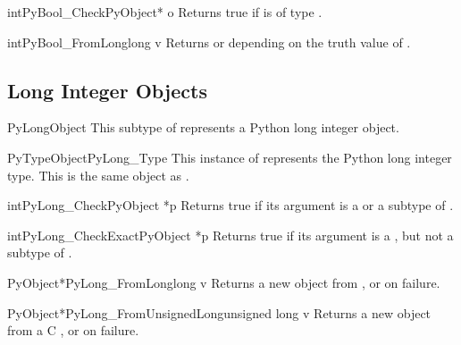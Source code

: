 \begin{cfuncdesc}{int}{PyBool_Check}{PyObject* o}
  Returns true if  is of type .
\end{cfuncdesc}

\begin{cfuncdesc}{int}{PyBool_FromLong}{long v}
Returns  or  depending on the
truth value of .
\end{cfuncdesc}

\subsection{Long Integer Objects \label{longObjects}}

\begin{ctypedesc}{PyLongObject}
  This subtype of  represents a Python long integer
  object.
\end{ctypedesc}

\begin{cvardesc}{PyTypeObject}{PyLong_Type}
  This instance of  represents the Python long
  integer type.  This is the same object as .
\end{cvardesc}

\begin{cfuncdesc}{int}{PyLong_Check}{PyObject *p}
  Returns true if its argument is a  or a subtype
  of .
\end{cfuncdesc}

\begin{cfuncdesc}{int}{PyLong_CheckExact}{PyObject *p}
  Returns true if its argument is a , but not a
  subtype of .
\end{cfuncdesc}

\begin{cfuncdesc}{PyObject*}{PyLong_FromLong}{long v}
  Returns a new  object from , or \NULL{}
  on failure.
\end{cfuncdesc}

\begin{cfuncdesc}{PyObject*}{PyLong_FromUnsignedLong}{unsigned long v}
  Returns a new  object from a C , or \NULL{} on failure.
\end{cfuncdesc}

